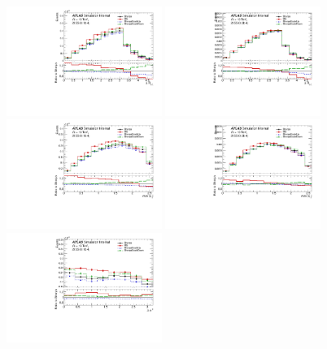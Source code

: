 \begin{figure}[!htb]
\centering
\includegraphics[width=0.45\textwidth]{Plots/ttV/c_Region_0_DRll01}
\includegraphics[width=0.45\textwidth]{Plots/ttV/c_Region_1_DRll01}\\
\includegraphics[width=0.45\textwidth]{Plots/ttV/c_Region_0_maxEta_ll} 
\includegraphics[width=0.45\textwidth]{Plots/ttV/c_Region_1_maxEta_ll}\\
\includegraphics[width=0.45\textwidth]{Plots/ttV/c_Region_0_lep_dPhi} 

\end{figure}
